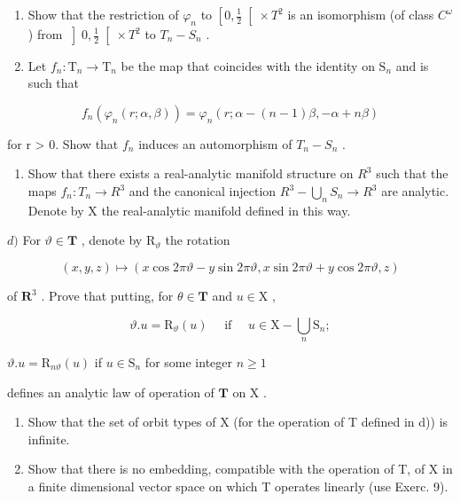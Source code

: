 \begin{enumerate}
\def\labelenumi{\alph{enumi})}
\item
  Show that the restriction of \(\varphi_{n}\) to \(\left[0,\frac{1}{2}\right[\times T^{2}\) is an isomorphism (of class \(C^{\omega}\) ) from \(\left]0,\frac{1}{2}\right[\times T^{2}\) to \(T_{n}-S_{n}\) .
\item
  Let \(f_{n}:\mathrm{T}_{n}\to \mathrm{T}_{n}\) be the map that coincides with the identity on \(\mathrm{S}_n\) and is such that
\end{enumerate}

\[
f _ {n} (\varphi_ {n} (r; \alpha , \beta)) = \varphi_ {n} (r; \alpha - (n - 1) \beta , - \alpha + n \beta)
\]

for r \textgreater{} 0. Show that \(f_{n}\) induces an automorphism of \(T_{n} - S_{n}\) .

\begin{enumerate}
\def\labelenumi{\alph{enumi})}
\setcounter{enumi}{2}
\tightlist
\item
  Show that there exists a real-analytic manifold structure on \(R^{3}\) such that the maps \(f_{n}: T_{n} \to R^{3}\) and the canonical injection \(R^{3}-\bigcup_{n} S_{n} \to R^{3}\) are analytic. Denote by X the real-analytic manifold defined in this way.
\end{enumerate}

\(d)\) For \(\vartheta \in \mathbf{T}\) , denote by \(\mathrm{R}_{\vartheta}\) the rotation

\[
(x, y, z) \mapsto (x \cos 2 \pi \vartheta - y \sin 2 \pi \vartheta , x \sin 2 \pi \vartheta + y \cos 2 \pi \vartheta , z)
\]

of \(\mathbf{R}^3\) . Prove that putting, for \(\theta \in \mathbf{T}\) and \(u \in \mathrm{X}\) ,

\[
\vartheta . u = \mathrm{R} _ {\vartheta} (u) \quad \text { if } \quad u \in \mathrm{X} - \bigcup_ {n} \mathrm{S} _ {n};
\]

\(\vartheta .u = \mathrm{R}_{n\vartheta}(u)\) if \(u\in \mathrm{S}_n\) for some integer \(n\geq 1\)

defines an analytic law of operation of \(\mathbf{T}\) on \(\mathrm{X}\) .

\begin{enumerate}
\def\labelenumi{\alph{enumi})}
\setcounter{enumi}{4}
\item
  Show that the set of orbit types of X (for the operation of T defined in d)) is infinite.
\item
  Show that there is no embedding, compatible with the operation of T, of X in a finite dimensional vector space on which T operates linearly (use Exerc. 9).
\end{enumerate}

